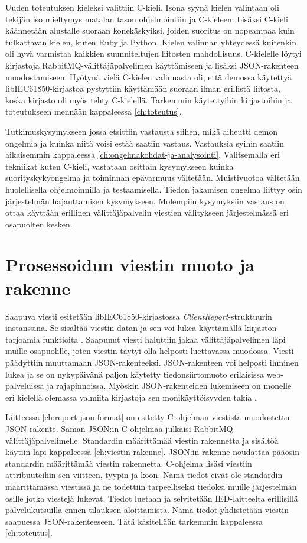 Uuden toteutuksen kieleksi valittiin C-kieli. Isona syynä kielen valintaan oli tekijän iso mieltymys matalan tason ohjelmointiin ja C-kieleen. Lisäksi C-kieli käännetään alustalle suoraan konekäskyiksi, joiden suoritus on nopeampaa kuin tulkattavan kielen, kuten Ruby ja Python. Kielen valinnan yhteydessä kuitenkin oli hyvä varmistaa kaikkien suunniteltujen liitosten mahdollisuus. C-kielelle löytyi kirjastoja RabbitMQ-välittäjäpalvelimen käyttämiseen ja lisäksi JSON-rakenteen muodostamiseen. Hyötynä vielä C-kielen valinnasta oli, että demossa käytettyä libIEC61850-kirjastoa pystyttiin käyttämään suoraan ilman erillistä liitosta, koska kirjasto oli myös tehty C-kielellä. Tarkemmin käytettyihin kirjastoihin ja toteutukseen mennään kappaleessa \ref{ch:toteutus}.

Tutkimuskysymykseen jossa etsittiin vastausta siihen, mikä aiheutti demon ongelmia ja kuinka niitä voisi estää saatiin vastaus. Vastauksia syihin saatiin aikaisemmin kappaleessa \ref{ch:ongelmakohdat-ja-analysointi}. Valitsemalla eri tekniikat kuten C-kieli, vastataan osittain kysymykseen kuinka suorityskykyongelma ja toiminnan epävarmuus vältetään. Muistivuotoa vältetään huolellisella ohjelmoinnilla ja testaamisella. Tiedon jakamisen ongelma liittyy osin järjestelmän hajauttamisen kysymykseen. Molempiin kysymyksiin vastaus on ottaa käyttään erillinen välittäjäpalvelin viestien välitykseen järjestelmässä eri osapuolten kesken.


\section{Prosessoidun viestin muoto ja rakenne}
Saapuva viesti esitetään libIEC61850-kirjastossa \emph{ClientReport}-struk\-tuu\-rin instanssina. Se sisältää viestin datan ja sen voi lukea käyttämällä kirjaston tarjoamia funktioita \mbox{\cite{libIEC61850-doc}}. Saapunut viesti haluttiin jakaa välittäjäpalvelimen läpi muille osapuolille, joten viestin täytyi olla helposti luettavassa muodossa. Viesti päädyttiin muuttamaan JSON-rakenteeksi. JSON-rakenteen voi helposti ihminen lukea ja se on nykypäivänä paljon käytetty tiedonsiirtomuoto erilaisissa web-palveluissa ja rajapinnoissa. Myöskin JSON-rakenteiden lukemiseen on monelle eri kielellä olemassa valmiita kirjastoja sen monikäyttöisyyden takia \mbox{\cite{Patrizio2016}}.

Liitteessä \ref{ch:report-json-format} on esitetty C-ohjelman viestistä muodostettu JSON-rakente. Saman JSON:in C-ohjelmaa julkaisi RabbitMQ-välittäjäpalvelimelle. Standardin määrittämää viestin rakennetta ja sisältöä käytiin läpi kappaleessa \ref{ch:viestin-rakenne}. JSON:in rakenne noudattaa pääosin standardin määrittämää viestin rakennetta. C-ohjelma lisäsi viestiin attribuuteihin sen viitteen, tyypin ja koon. Nämä tiedot eivät ole standardin määrittämässä viestissä ja ne todettiin tarpeelliseksi tiedoksi muille järjestelmän osille jotka viestejä lukevat. Tiedot luetaan ja selvitetään IED-laitteelta erillisillä palvelukutsuilla ennen tilauksen aloittamista. Nämä tiedot yhdistetään viestin saapuessa JSON-rakenteeseen. Tätä käsitellään tarkemmin kappaleessa \ref{ch:toteutus}.

